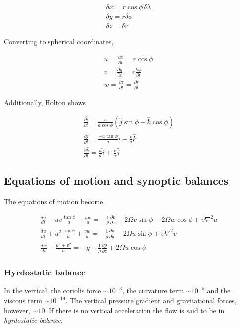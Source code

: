 \documentclass[a4paper,12pt]{article}
\begin{document}
\begin{align}
\delta x = r\cos\phi \, \delta \lambda \\
\delta y = r \delta \phi\\
\delta z = \delta r
\end{align}

Converting to spherical coordinates,

\begin{align}
u = \frac{\partial x}{\partial t} = r\cos\phi\\
v = \frac{\partial y}{\partial t} = r\frac{\partial \phi}{\partial t}\\
w = \frac{\partial z}{\partial t} = \frac{\partial r}{\partial t}
\end{align}

Additionally, Holton shows

\begin{align}
\frac{\partial \hat{i}}{\partial t} = \frac{u}{a\cos\phi}(\hat{j}\sin\phi - \hat{k}\cos\phi)\\
\frac{\partial \hat{j}}{\partial t} = \frac{-u\tan\phi}{a} \hat{i} - \frac{v}{a} \hat{k}\\
\frac{\partial \hat{k}}{\partial t} = \frac{u}{a} \hat{i} + \frac{v}{a} \hat{j}
\end{align}

\subsection*{Equations of motion and synoptic balances}
The equations of motion become,

\begin{align}
\frac{du}{dt} - uv\frac{\tan\phi}{a} + \frac{uw}{a} = -\frac{1}{\rho} \frac{\partial p}{\partial x} + 2\Omega v\sin\phi - 2\Omega w\cos\phi + \upsilon\nabla^2 u\\
\frac{du}{dt} + u^2\frac{\tan\phi}{a} + \frac{vw}{a} = -\frac{1}{\rho} \frac{\partial p}{\partial y} - 2\Omega u \sin\phi + \upsilon\nabla^2 v\\
\frac{dw}{dt} - \frac{u^2 + v^2}{a} = -g - \frac{1}{\rho}\frac{\partial p}{\partial z} + 2\Omega u \cos\phi
\end{align}

\subsubsection*{Hyrdostatic balance}
In the vertical, the coriolis force $\sim 10^{-3}$, the curvature term $\sim 10^{-5}$ and the viscous term $\sim 10^{-19}$. The vertical pressure gradient and gravitational forces, however, $\sim 10$. If there is no vertical acceleration the flow is said to be in \emph{hyrdostatic balance},
\end{document}
